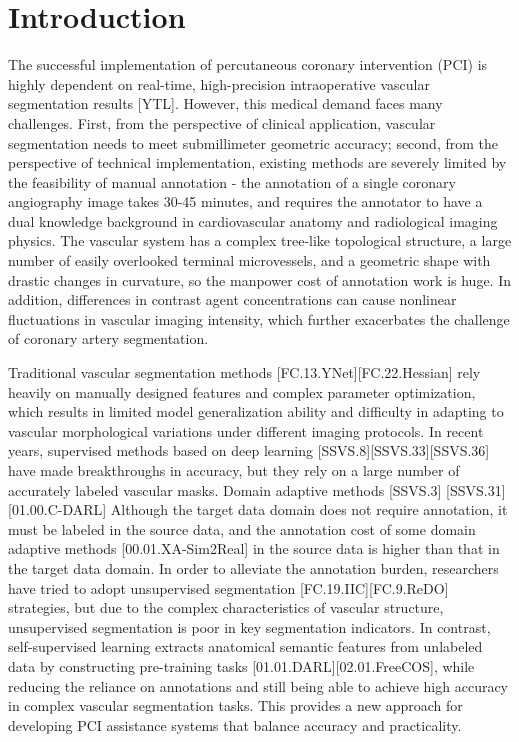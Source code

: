 \section{Introduction}
\label{sec:intro}

The successful implementation of percutaneous coronary intervention (PCI) is highly dependent on real-time, high-precision intraoperative vascular segmentation results [YTL]. However, this medical demand faces many challenges. First, from the perspective of clinical application, vascular segmentation needs to meet submillimeter geometric accuracy; second, from the perspective of technical implementation, existing methods are severely limited by the feasibility of manual annotation - the annotation of a single coronary angiography image takes 30-45 minutes, and requires the annotator to have a dual knowledge background in cardiovascular anatomy and radiological imaging physics. The vascular system has a complex tree-like topological structure, a large number of easily overlooked terminal microvessels, and a geometric shape with drastic changes in curvature, so the manpower cost of annotation work is huge. In addition, differences in contrast agent concentrations can cause nonlinear fluctuations in vascular imaging intensity, which further exacerbates the challenge of coronary artery segmentation.


Traditional vascular segmentation methods [FC.13.YNet][FC.22.Hessian] rely heavily on manually designed features and complex parameter optimization, which results in limited model generalization ability and difficulty in adapting to vascular morphological variations under different imaging protocols. In recent years, supervised methods based on deep learning [SSVS.8][SSVS.33][SSVS.36] have made breakthroughs in accuracy, but they rely on a large number of accurately labeled vascular masks. Domain adaptive methods [SSVS.3] [SSVS.31][01.00.C-DARL] Although the target data domain does not require annotation, it must be labeled in the source data, and the annotation cost of some domain adaptive methods [00.01.XA-Sim2Real] in the source data is higher than that in the target data domain. In order to alleviate the annotation burden, researchers have tried to adopt unsupervised segmentation [FC.19.IIC][FC.9.ReDO] strategies, but due to the complex characteristics of vascular structure, unsupervised segmentation is poor in key segmentation indicators. In contrast, 
self-supervised learning extracts anatomical semantic features from unlabeled data by constructing pre-training tasks \cite{01.02.SSVS}[01.01.DARL][02.01.FreeCOS], 
while reducing the reliance on annotations and still being able to achieve high accuracy in complex vascular segmentation tasks. 
This provides a new approach for developing PCI assistance systems that balance accuracy and practicality.

